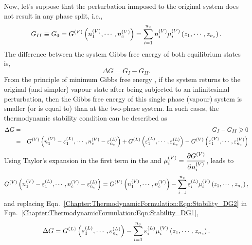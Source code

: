Now, let's suppose that the perturbation inmposed to the original system does not result in any phase split, i.e.,
\begin{equation}
    G_{II} \equiv G_{0} = \mfr[G]{}{V}\left(\mfr[n]{1}{V}, \cdots, \mfr[n]{c}{V}\right) = \summation_{i=1}^{n_{c}}\mfr[n]{i}{V}\mfr[\mu]{i}{V} \left(z_{1}, \cdots, z_{n_{c}}\right).
\end{equation}
The difference between the system Gibbs free energy of both equilibrium states is,
\begin{displaymath}
    \Delta G = G_{I} -G_{II}.
\end{displaymath}
From the principle of minimum Gibbs free energy \citep{Callen_Book}, if the system returns to the original (and simpler) vapour state after being subjected to an infinitesimal perturbation, then the Gibbs free energy of this single phase (vapour) system is smaller (or is equal to) than at the two-phase system. In such cases, the thermodynamic stability condition can be described as
\begin{eqnarray}
     \Delta G &=& G_{I} -G_{II} \ge 0\nonumber \\
              &=& \mfr[G]{}{V}\left(\mfr[n]{1}{V}-\mfr[\varepsilon]{1}{L}, \cdots, \mfr[n]{c}{V}-\mfr[\varepsilon]{n_{c}}{L}\right) + \mfr[G]{}{L}\left(\mfr[\varepsilon]{1}{L}, \cdots, \mfr[\varepsilon]{n_{c}}{L}\right) - \mfr[G]{}{V}\left(\mfr[\varepsilon]{1}{V}, \cdots, \mfr[\varepsilon]{n_{c}}{V}\right) \label{Chapter:ThermodynamicFormulation:Eqn:Stability_DG1}
\end{eqnarray} 
Using Taylor's expansion in the first term in the \rhs and $\mfr[\mu]{i}{V}=\frc{\partial\mfr[G]{}{V}}{\partial\mfr[n]{i}{V}}$, leads to
\begin{equation}
    \mfr[G]{}{V}\left(\mfr[n]{1}{V}-\mfr[\varepsilon]{1}{L}, \cdots, \mfr[n]{c}{V}-\mfr[\varepsilon]{n_{c}}{L}\right) = \mfr[G]{}{V}\left(\mfr[n]{1}{V}, \cdots, \mfr[n]{c}{V}\right) - \summation_{i=1}^{n_{c}}\mfr[\varepsilon]{i}{L}\mfr[\mu]{i}{V}\left(z_{1}, \cdots, z_{n_{c}}\right),\label{Chapter:ThermodynamicFormulation:Eqn:Stability_DG2}
\end{equation}
and replacing Eqn.~\ref{Chapter:ThermodynamicFormulation:Eqn:Stability_DG2} in Eqn.~\ref{Chapter:ThermodynamicFormulation:Eqn:Stability_DG1}, 
\begin{equation}
    \Delta G = \mfr[G]{}{L}\left(\mfr[\varepsilon]{1}{L}, \cdots, \mfr[\varepsilon]{n_{c}}{L}\right) - \summation_{i=1}^{n_{c}}\mfr[\varepsilon]{i}{L}\mfr[\mu]{i}{V}\left(z_{1}, \cdots, z_{n_{c}}\right).\label{Chapter:ThermodynamicFormulation:Eqn:Stability_DG3}
\end{equation}
